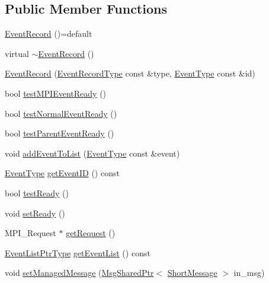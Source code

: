 \subsection*{Public Member Functions}
\begin{DoxyCompactItemize}
\item 
\hyperlink{structvt_1_1event_1_1_event_record_ad43151ff7b64e4aea444c3605b6a987e}{Event\+Record} ()=default
\item 
virtual \hyperlink{structvt_1_1event_1_1_event_record_ae46827dcbe7eab923e6083006475fa65}{$\sim$\+Event\+Record} ()
\item 
\hyperlink{structvt_1_1event_1_1_event_record_afee008ad8096ff0aa3a6bed7e94d9701}{Event\+Record} (\hyperlink{namespacevt_1_1event_a1ea9fec44d101bf40b8fd786d44ebed9}{Event\+Record\+Type} const \&type, \hyperlink{namespacevt_a009267401def7ae8bf201892222d060f}{Event\+Type} const \&id)
\item 
bool \hyperlink{structvt_1_1event_1_1_event_record_ace2823ff35b94e886a1448f8bcd039a7}{test\+M\+P\+I\+Event\+Ready} ()
\item 
bool \hyperlink{structvt_1_1event_1_1_event_record_ac19ef521b531c45e30acf3838c3b1320}{test\+Normal\+Event\+Ready} ()
\item 
bool \hyperlink{structvt_1_1event_1_1_event_record_a64981723c87d85c2d76251d333538a24}{test\+Parent\+Event\+Ready} ()
\item 
void \hyperlink{structvt_1_1event_1_1_event_record_aaeb3fbdfa74efbb88570ed88295af3ee}{add\+Event\+To\+List} (\hyperlink{namespacevt_a009267401def7ae8bf201892222d060f}{Event\+Type} const \&event)
\item 
\hyperlink{namespacevt_a009267401def7ae8bf201892222d060f}{Event\+Type} \hyperlink{structvt_1_1event_1_1_event_record_a42de3f14e7aee457dfc44f6fdc57b874}{get\+Event\+ID} () const
\item 
bool \hyperlink{structvt_1_1event_1_1_event_record_a82d8f84b3aa975cd12e1972745491106}{test\+Ready} ()
\item 
void \hyperlink{structvt_1_1event_1_1_event_record_a11d38e147a2a389c71a3fec237b7d858}{set\+Ready} ()
\item 
M\+P\+I\+\_\+\+Request $\ast$ \hyperlink{structvt_1_1event_1_1_event_record_a9444f340945fa732113583fc0b04ae7f}{get\+Request} ()
\item 
\hyperlink{namespacevt_1_1event_aa507caad8ea8ee959ccef2d57753dceb}{Event\+List\+Ptr\+Type} \hyperlink{structvt_1_1event_1_1_event_record_abb891d63f4027f5d36d53d3080c33cdf}{get\+Event\+List} () const
\item 
void \hyperlink{structvt_1_1event_1_1_event_record_a9354b50ad690549bca45eb6e68b121f0}{set\+Managed\+Message} (\hyperlink{namespacevt_ab2b3d506ec8e8d1540aede826d84a239}{Msg\+Shared\+Ptr}$<$ \hyperlink{namespacevt_a1125ac1da6c0bbf141e0ea0739d7602d}{Short\+Message} $>$ in\+\_\+msg)
\end{DoxyCompactItemize}
